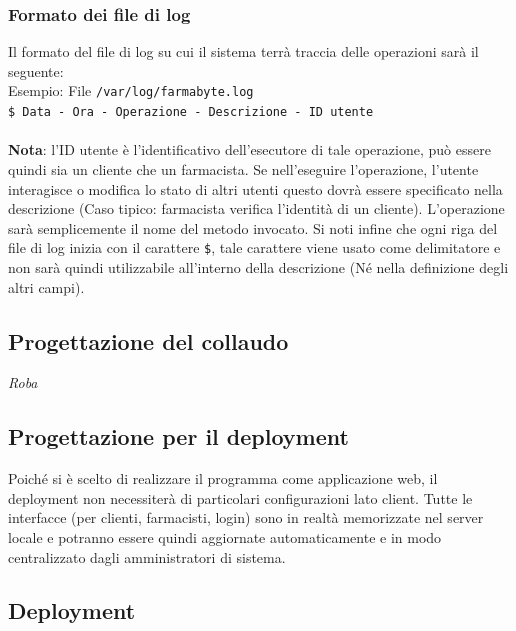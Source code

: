\subsubsection{Formato dei file di log}

Il formato del file di log su cui il sistema terrà traccia delle operazioni
sarà il seguente:\\

Esempio: File \texttt{/var/log/farmabyte.log}\\

\texttt{\$ Data - Ora - Operazione - Descrizione - ID utente}\\ \\
\textbf{Nota}: l'ID utente è l'identificativo dell'esecutore di tale operazione, può essere quindi sia un cliente che un farmacista.
Se nell'eseguire l'operazione, l'utente interagisce o modifica lo stato di altri utenti questo dovrà essere specificato nella descrizione (Caso tipico: farmacista verifica l'identità di un cliente).
L'operazione sarà semplicemente il nome del metodo invocato. 
Si noti infine che ogni riga del file di log inizia con il carattere \texttt{\$}, tale carattere viene usato come delimitatore e non sarà quindi utilizzabile all'interno della descrizione (Né nella definizione degli altri campi).

\newpage

\subsection{Progettazione del collaudo}

\textit{Roba}

\newpage

\subsection{Progettazione per il deployment}

Poiché si è scelto di realizzare il programma come applicazione web, il deployment non necessiterà di particolari configurazioni lato client.
Tutte le interfacce (per clienti, farmacisti, login) sono in realtà memorizzate nel server locale e potranno essere quindi aggiornate automaticamente e in modo centralizzato dagli amministratori di sistema. 

\newpage

\subsection{Deployment}

